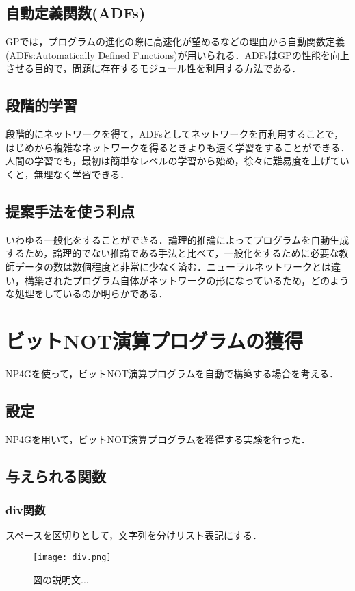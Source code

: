 \documentclass[exploratorypaper]{jsaiart} %
\begin{document}
\subsection{自動定義関数(ADFs)}
GPでは，プログラムの進化の際に高速化が望めるなどの理由から自動関数定義(ADFs:Automatically Defined Functions)\cite{adfs}が用いられる．ADFsはGPの性能を向上させる目的で，問題に存在するモジュール性を利用する方法である．
\subsection{段階的学習}
段階的にネットワークを得て，ADFsとしてネットワークを再利用することで，はじめから複雑なネットワークを得るときよりも速く学習をすることができる．
人間の学習でも，最初は簡単なレベルの学習から始め，徐々に難易度を上げていくと，無理なく学習できる．

\subsection{提案手法を使う利点}
いわゆる一般化をすることができる．論理的推論によってプログラムを自動生成するため，論理的でない推論である手法と比べて，一般化をするために必要な教師データの数は数個程度と非常に少なく済む．ニューラルネットワークとは違い，構築されたプログラム自体がネットワークの形になっているため，どのような処理をしているのか明らかである．

\section{ビットNOT演算プログラムの獲得}
NP4Gを使って，ビットNOT演算プログラムを自動で構築する場合を考える．

\subsection{設定}
NP4Gを用いて，ビットNOT演算プログラムを獲得する実験を行った．

\subsection{与えられる関数}
\subsubsection{div関数}
スペースを区切りとして，文字列を分けリスト表記にする．

\begin{figure}[t]
    \begin{center}
        \texttt{[image: div.png]}
    \end{center}
    \capwidth=50mm %
    \caption{図の説明文... }
\end{figure}
\end{document}
